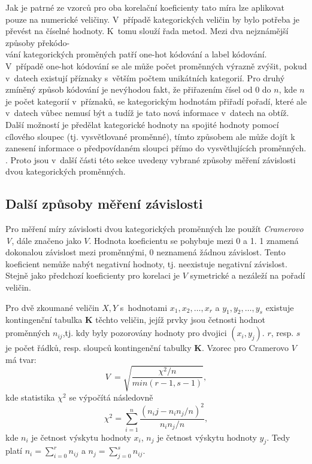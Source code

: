 Jak je patrné ze vzorců pro oba korelační koeficienty tato míra lze aplikovat pouze na numerické veličiny. V~případě kategorických veličin by bylo potřeba je převést na číselné hodnoty. K~tomu slouží řada metod. Mezi dva nejznámější způsoby překódo-\\vání kategorických proměných patří one-hot kódování a label kódování. V~případě one-hot kódování se ale může počet proměnných výrazně zvýšit, pokud v~datech existují příznaky s~větším počtem unikátních kategorií. Pro druhý zmíněný způsob kódování je nevýhodou fakt, že přiřazením čísel od 0 do $n$, kde $n$ je počet kategorií v~příznaků, se kategorickým hodnotám přiřadí pořadí, které ale v~datech vůbec nemusí být a tudíž je tato nová informace v~datech na obtíž. Další možností je předělat kategorické hodnoty na spojité hodnoty pomocí cílového sloupec (tj. vysvětlované proměnné), tímto způsobem ale může dojít k zanesení informace o předpovídaném sloupci přímo do vysvětlujících proměnných. \cite{bib:encoding}. Proto jsou v~další části této sekce uvedeny vybrané způsoby měření závislosti dvou kategorických proměnných.

\subsection{Další způsoby měření závislosti}

Pro měření míry závislosti dvou kategorických proměnných lze použít \emph{Cramerovo V}, dále značeno jako $V$. 
Hodnota koeficientu se pohybuje mezi 0 a 1. 1 znamená dokonalou závislost mezi proměnnými, 0 neznamená žádnou závislost. Tento koeficient nemůže nabýt negativní hodnoty, tj. neexistuje negativní závislost. Stejně jako předchozí koeficienty pro korelaci je $V$ symetrické a nezáleží na pořadí veličin.\cite{bib:correl,bib:MB}

Pro dvě zkoumané veličin $X, Y$ s~hodnotami $x_1, x_2, \ldots, x_r$ a $y_1, y_2, \ldots, y_s$ existuje kontingenční tabulka $\mathbf{K}$ těchto veličin, jejíž prvky jsou četnosti hodnot proměnných $n_{ij}$,tj. kdy byly pozorovány hodnoty pro dvojici $(x_i, y_j)$. $r$, resp. $s$ je počet řádků, resp. sloupců kontingenční tabulky $\mathbf{K}$.
Vzorec pro Cramerovo $V$ má tvar:
\begin{equation}
    V~= \sqrt{\frac{\chi^2 / n}{min(r-1, s-1)}},
\end{equation}
kde statistika $\chi^2$ se výpočítá následovně
\begin{equation}
    \chi^2 = \sum_{i=1}^n \frac{(n_ij - n_in_j/n)^2}{n_in_j/n},
\end{equation}
kde $n_i$ je četnost výskytu hodnoty $x_i$, $n_j$ je četnost výskytu hodnoty $y_j$. Tedy platí $n_i=\sum_{i=0}^r{n_{ij}}$ a $n_j=\sum_{j=0}^s{n_{ij}}$.\cite{bib:statology,bib:correl,bib:MB}

